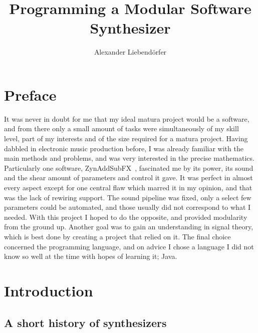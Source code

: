 \documentclass[11pt,a4paper]{article}
\title{\LARGE \textbf {Programming a Modular Software Synthesizer} \vspace{1em}}
\author{Alexander Liebend\"{o}rfer}
\begin{document}
\maketitle
\clearpage
\tableofcontents

\clearpage

\section{Preface}

It was never in doubt for me that my ideal matura project would be a software, and from there only a small amount of tasks were simultaneously of my skill level, part of my interests and of the size required for a matura project. Having dabbled in electronic music production before, I was already familiar with the main methods and problems, and was very interested in the precise mathematics. Particularly one software, ZynAddSubFX~\cite{ZASF}, fascinated me by its power, its sound and the shear amount of parameters and control it gave. It was perfect in almost every aspect except for one central flaw which marred it in my opinion, and that was the lack of rewiring support. The sound pipeline was fixed, only a select few parameters could be automated, and those usually did not correspond to what I needed. With this project I hoped to do the opposite, and provided modularity from the ground up. Another goal was to gain an understanding in signal theory, which is best done by creating a project that relied on it. The final choice concerned the programming language, and on advice I chose a language I did not know so well at the time with hopes of learning it; Java.


\section{Introduction}

\subsection{A short history of synthesizers}
\end{document}
